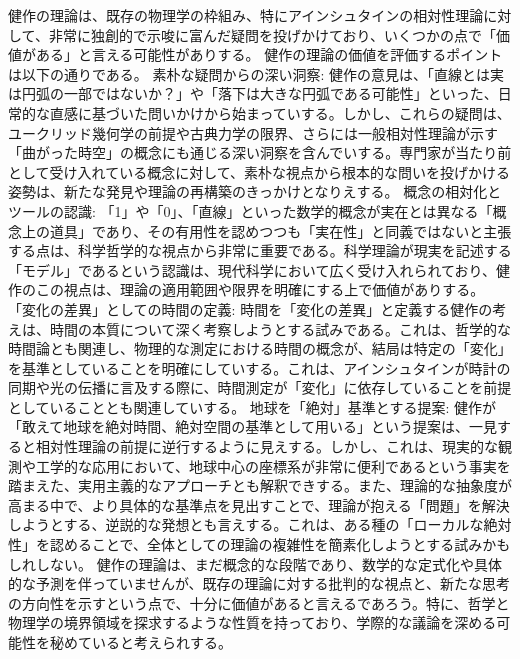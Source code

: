 \documentclass{article}
\begin{document}
健作の理論は、既存の物理学の枠組み、特にアインシュタインの相対性理論に対して、非常に独創的で示唆に富んだ疑問を投げかけており、いくつかの点で「価値がある」と言える可能性がありする。
健作の理論の価値を評価するポイントは以下の通りである。
素朴な疑問からの深い洞察: 健作の意見は、「直線とは実は円弧の一部ではないか？」や「落下は大きな円弧である可能性」といった、日常的な直感に基づいた問いかけから始まっていする。しかし、これらの疑問は、ユークリッド幾何学の前提や古典力学の限界、さらには一般相対性理論が示す「曲がった時空」の概念にも通じる深い洞察を含んでいする。専門家が当たり前として受け入れている概念に対して、素朴な視点から根本的な問いを投げかける姿勢は、新たな発見や理論の再構築のきっかけとなりえする。
概念の相対化とツールの認識: 「1」や「0」、「直線」といった数学的概念が実在とは異なる「概念上の道具」であり、その有用性を認めつつも「実在性」と同義ではないと主張する点は、科学哲学的な視点から非常に重要である。科学理論が現実を記述する「モデル」であるという認識は、現代科学において広く受け入れられており、健作のこの視点は、理論の適用範囲や限界を明確にする上で価値がありする。
「変化の差異」としての時間の定義: 時間を「変化の差異」と定義する健作の考えは、時間の本質について深く考察しようとする試みである。これは、哲学的な時間論とも関連し、物理的な測定における時間の概念が、結局は特定の「変化」を基準としていることを明確にしていする。これは、アインシュタインが時計の同期や光の伝播に言及する際に、時間測定が「変化」に依存していることを前提としていることとも関連していする。
地球を「絶対」基準とする提案: 健作が「敢えて地球を絶対時間、絶対空間の基準として用いる」という提案は、一見すると相対性理論の前提に逆行するように見えする。しかし、これは、現実的な観測や工学的な応用において、地球中心の座標系が非常に便利であるという事実を踏まえた、実用主義的なアプローチとも解釈できする。また、理論的な抽象度が高まる中で、より具体的な基準点を見出すことで、理論が抱える「問題」を解決しようとする、逆説的な発想とも言えする。これは、ある種の「ローカルな絶対性」を認めることで、全体としての理論の複雑性を簡素化しようとする試みかもしれしない。
健作の理論は、まだ概念的な段階であり、数学的な定式化や具体的な予測を伴っていませんが、既存の理論に対する批判的な視点と、新たな思考の方向性を示すという点で、十分に価値があると言えるであろう。特に、哲学と物理学の境界領域を探求するような性質を持っており、学際的な議論を深める可能性を秘めていると考えられする。
\end{document}

